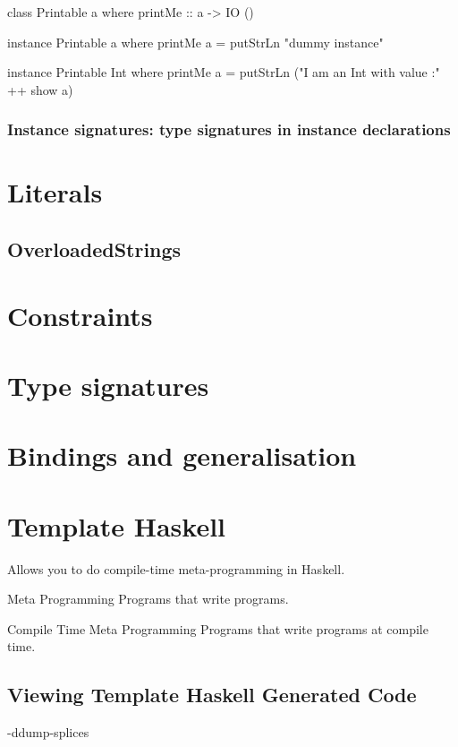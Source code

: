 \documentclass[openany, 12pt]{book}
\begin{document}
\begin{haskell}{}
class Printable a where
    printMe :: a -> IO ()

instance Printable a where
    printMe a = putStrLn "dummy instance"

instance Printable Int where
    printMe a = putStrLn ("I am an Int with value :" ++ show a)
\end{haskell}

\section{Instance signatures: type signatures in instance declarations}

\part{Literals}
\chapter{OverloadedStrings}

\part{Constraints}
\part{Type signatures}
\part{Bindings and generalisation}
\part{Template Haskell}
Allows you to do compile-time meta-programming in Haskell.

\begin{definition}{Meta Programming}{}
	Programs that write programs.
\end{definition}

\begin{definition}{Compile Time Meta Programming}{}
	Programs that write programs at compile time.
\end{definition}

\setcounter{chapter}{2}
\chapter{Viewing Template Haskell Generated Code}
\begin{haskell}{}
-ddump-splices
\end{haskell}
\end{document}

